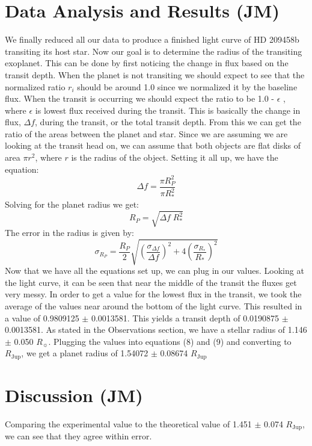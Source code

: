 \documentclass{aastex61}
\begin{document}
\section{Data Analysis and Results (JM)}
We finally reduced all our data to produce a finished light curve of HD 209458b transiting its host star. Now our goal is to determine the radius of the transiting exoplanet. This can be done by first noticing the change in flux based on the transit depth. When the planet is not transiting we should expect to see that the normalized ratio $r_{i}$ should be around 1.0 since we normalized it by the baseline flux. When the transit is occurring we should expect the ratio to be 1.0 - $\epsilon$ , where $\epsilon$ is lowest flux received during the transit. This is basically the change in flux, $\Delta f$, during the transit, or the total transit depth. From this we can get the ratio of the areas between the planet and star. Since we are assuming we are looking at the transit head on, we can assume that both objects are flat disks of area $\pi r^{2}$, where $r$ is the radius of the object. Setting it all up, we have the equation:
\begin{equation}
	\Delta f = \frac{\pi R_{P}^{2}}{\pi R_{*}^{2}}
\end{equation}
Solving for the planet radius we get:
\begin{equation}
	R_{P} = \sqrt{\Delta f \; R_{*}^{2}}
\end{equation}
The error in the radius is given by:
\begin{equation}
	\sigma_{R_{P}} = \frac{R_{P}}{2}\sqrt{\left( \frac{\sigma_{ \Delta f}}{\Delta f}\right)^{2}  + 4\left( \frac{\sigma_{ R_{*}}}{R_{*}}\right)^{2} } 
\end{equation}
Now that we have all the equations set up, we can plug in our values. Looking at the light curve, it can be seen that near the middle of the transit the fluxes get very messy. In order to get a value for the lowest flux in the transit, we took the average of the values near around the bottom of the light curve. This resulted in a value of 0.9809125 $\pm$ 0.0013581. This yields a transit depth of 0.0190875 $\pm$ 0.0013581. As stated in the Observations section, we have a stellar radius of 1.146 $\pm$ 0.050 $R_{\sun}$. Plugging the values into equations (8) and (9) and converting to $R_{\text{Jup}}$, we get a planet radius of 1.54072 $\pm$ 0.08674 $R_{\text{Jup}}$
\section{Discussion (JM)}
Comparing the experimental value to the theoretical value of 1.451 $\pm$ 0.074 $R_{\text{Jup}}$, we can see that they agree within error. 
\end{document}
